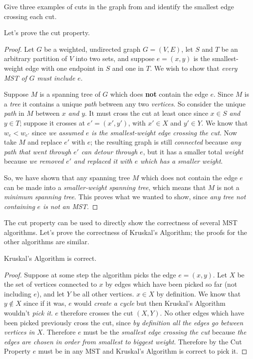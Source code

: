 \documentclass{tufte-handout}
\begin{document}
\begin{questions}
\item Give three examples of cuts in the graph from 
  and identify the smallest edge crossing each cut.
\end{questions}

Let's prove the cut property.

\begin{proof}
  Let $G$ be a weighted, undirected graph $G = (V,E)$, let $S$ and $T$
  be an arbitrary partition of $V$ into two sets, and suppose
  $e = (x,y)$ is the smallest-weight edge with one endpoint in $S$ and
  one in $T$.  We wish to show that \emph{every MST of $G$ must
    include $e$}.

  Suppose $M$ is a spanning tree of $G$ which does \textbf{not}
  contain the edge $e$.  Since $M$ is a \emph{tree} it contains a unique
  \emph{path} between any two \emph{vertices}. So consider the unique
  \emph{path} in $M$ between \emph{$x$ and $y$}.   It must cross
  the cut at least once since \emph{$x \in S$ and $y \in T$}; suppose it
  crosses at $e' = (x',y')$, with $x' \in X$ and $y' \in Y$.
  We know that $w_e < w_{e'}$ since \emph{we assumed $e$ is the
    smallest-weight edge crossing the cut}. Now take $M$ and
  replace $e'$ with $e$; the resulting graph is still
  \emph{connected} because \emph{any path that went through $e'$ can
    detour through $e$}, but it has a smaller total \emph{weight}
  because \emph{we removed $e'$ and replaced it with $e$ which has a
    smaller weight}.

  So, we have shown that any spanning tree $M$ which does not contain
  the edge $e$ can be made into a \emph{smaller-weight spanning tree},
  which means that $M$ is not a \emph{minimum spanning tree}. This
  proves what we wanted to show, since \emph{any tree not containing
    $e$ is not an MST}.
\end{proof}

The cut property can be used to directly show the correctness of
several MST algorithms.  Let's prove the correctness of Kruskal's
Algorithm; the proofs for the other algorithms are similar.

\begin{thm}
  Kruskal's Algorithm is correct.
\end{thm}

\begin{proof}
  Suppose at some step the algorithm picks the edge $e = (x,y)$.  Let
  $X$ be the set of vertices connected to $x$ by edges which have been
  picked so far (not including $e$), and let $Y$ be all other
  vertices. $x \in X$ by definition.  We know that $y \notin X$ since
  if it was, $e$ would \emph{create a cycle} but then Kruskal's
  Algorithm wouldn't \emph{pick it}. $e$ therefore crosses the cut
  $(X,Y)$. No other edges which have been picked previously cross the
  cut, since \emph{by definition all the edges go between vertices in
    $X$}. Therefore $e$ must be the \emph{smallest edge crossing the
    cut} because \emph{the edges are chosen in order from smallest to
    biggest weight}. Therefore by the Cut Property $e$ must be in any
  MST and Kruskal's Algorithm is correct to pick it.
\end{proof}
\end{document}
